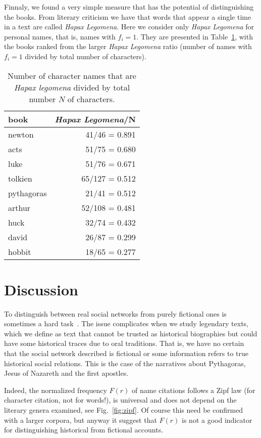 \documentclass[review]{elsarticle}
\begin{document}

Finnaly, we found a very simple measure that has the potential
of distinguishing the books. 
From literary criticism we have that words that 
appear a single time in a text are called 
\emph{Hapax Legomena}.
Here we consider only \emph{Hapax Legomena} for personal names,
that is, names with $f_i=1$. They are presented in Table~\ref{tab:hapax},
with the books ranked from the larger \emph{Hapax Legomena} ratio (number
of names with $f_i = 1$ divided by total number of characters).

\begin{table}[ht]
\centering\small
\begin{tabular}{l|r}\hline
\bf\hfil book\hfil & \bf\hfil\emph{Hapax Legomena}/N\hfil\\\hline
newton & 41/46 = 0.891 \\
acts & 51/75 = 0.680 \\
luke & 51/76 = 0.671 \\
tolkien & 65/127 = 0.512 \\
pythagoras & 21/41 = 0.512 \\
arthur & 52/108 = 0.481 \\
huck & 32/74 = 0.432 \\
david & 26/87 = 0.299 \\
hobbit & 18/65 = 0.277 \\
\hline
\end{tabular}
\caption{Number of character 
names that are \emph{Hapax legomena} divided by 
total number $N$ of characters.}
\label{tab:hapax}
\end{table}

\section{Discussion}

To distinguish between real social networks from purely fictional ones
is sometimes a hard task~\cite{alberich2002marvel,gleiser2007become}. 
The issue complicates when we study legendary texts, which we define
as text that cannot be trusted as historical biographies but could have
some historical traces due to oral traditions. That is,
we have no certain that the social network described is
fictional or some information refers to true historical
social relations. This is the case of the narratives 
about Pythagoras, Jesus of Nazareth and the first apostles. 

Indeed, the normalized frequency $F(r)$ of name citations
follows a Zipf law (for character citation, not for words!), 
is universal and does not
depend on the literary genera examined, see Fig.~\ref{fig:zipf}.
Of course this need be confirmed with a larger corpora, but
anyway it suggest that $F(r)$ is not a good indicator 
for distinguishing historical from fictional accounts.
\end{document}

